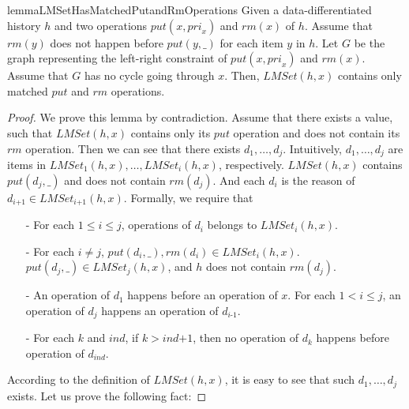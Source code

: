 \begin{restatable}{lemma}{LMSetHasMatchedPutandRmOperations}
\label{lemma:LMSet has matched put and rm operations}
Given a data-differentiated history $h$ and two operations $\textit{put}(x,\textit{pri}_x)$ and $\textit{rm}(x)$ of $h$. Assume that $\textit{rm}(y)$ does not happen before $\textit{put}(y,\_)$ for each item $y$ in $h$. Let $G$ be the graph representing the left-right constraint of $\textit{put}(x,\textit{pri}_x)$ and $\textit{rm}(x)$. Assume that $G$ has no cycle going through $x$. Then, $\textit{LMSet}(h,x)$ contains only matched $\textit{put}$ and $\textit{rm}$ operations.
\end{restatable}
\begin {proof}

We prove this lemma by contradiction. Assume that there exists a value, such that $\textit{LMSet}(h,x)$ contains only its $\textit{put}$ operation and does not contain its $\textit{rm}$ operation. Then we can see that there exists $d_1,\ldots,d_j$. Intuitively, $d_1,\ldots,d_j$ are items in $\textit{LMSet}_1(h,x), \ldots, \textit{LMSet}_i(h,x)$, respectively. $\textit{LMSet}(h,x)$ contains $\textit{put}(d_j,\_)$ and does not contain $\textit{rm}(d_j)$. And each $d_i$ is the reason of $d_{\textit{i+1}} \in \textit{LMSet}_{\textit{i+1}}(h,x)$. Formally, we require that

\begin{itemize}
\setlength{\itemsep}{0.5pt}
\item[-] For each $1 \leq i \leq j$, operations of $d_i$ belongs to $\textit{LMSet}_i(h,x)$. %

\item[-] For each $i \neq j$, $\textit{put}(d_i,\_),\textit{rm}(d_i) \in \textit{LMSet}_i(h,x)$. $\textit{put}(d_j,\_) \in \textit{LMSet}_j(h,x)$, and $h$ does not contain $\textit{rm}(d_j)$.

\item[-] An operation of $d_1$ happens before an operation of $x$. For each $1 < i \leq j$, an operation of $d_j$ happens an operation of $d_{\textit{i-1}}$.

\item[-] For each $k$ and $\textit{ind}$, if $k > \textit{ind+1}$, then no operation of $d_k$ happens before operation of $d_{\textit{ind}}$.
\end{itemize}

According to the definition of $\textit{LMSet}(h,x)$, it is easy to see that such $d_1,\ldots,d_j$ exists. Let us prove the following fact:


\end{proof}
